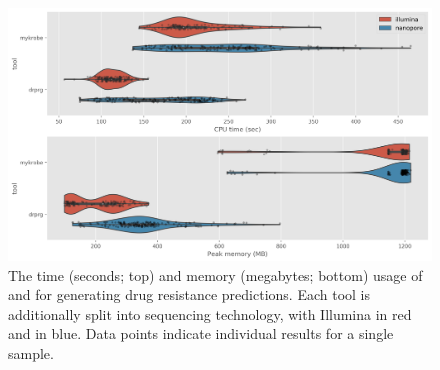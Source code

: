 \begin{figure}
\begin{center}
\includegraphics[width=0.90\columnwidth]{Chapter3/Figs/predict-comp-perf.png}
\caption{{The time (seconds; top) and memory (megabytes; bottom) usage of \mykrobe{} and \drprg{} for generating drug resistance predictions. Each tool is additionally split into sequencing technology, with Illumina in red and \ont{} in blue. Data points indicate individual results for a single sample.
{\label{fig:predict-comp-perf}}
}}
\end{center}
\end{figure}


